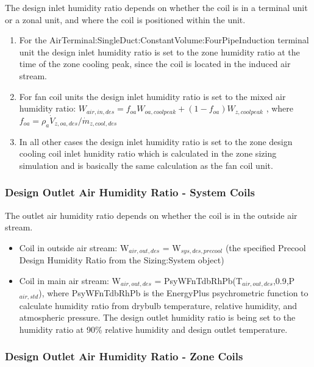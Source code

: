 The design inlet humidity ratio depends on whether the coil is in a terminal unit or a zonal unit, and where the coil is positioned within the unit.

\begin{enumerate}
\def\labelenumi{\arabic{enumi}.}
\item
  For the AirTerminal:SingleDuct:ConstantVolume:FourPipeInduction terminal unit the design inlet humidity ratio is set to the zone humidity ratio at the time of the zone cooling peak, since the coil is located in the induced air stream.
\item
  For fan coil units the design inlet humidity ratio is set to the mixed air humidity ratio: \(W_{air,in,des} = f_{oa}W_{oa,coolpeak} + \left(1-f_{oa}\right)W_{z,coolpeak}\) , where \(f_{oa} = \rho_a \dot V_{z,oa,des} / \dot m_{z,cool,des}\)
\item
  In all other cases the design inlet humidity ratio is set to the zone design cooling coil inlet hunidity ratio which is calculated in the zone sizing simulation and is basically the same calculation as the fan coil unit.
\end{enumerate}

\subsubsection{Design Outlet Air Humidity Ratio - System Coils}\label{design-outlet-air-humidity-ratio---system-coils}

The outlet air humidity ratio depends on whether the coil is in the outside air stream.

\begin{itemize}
\item
  Coil in outside air stream: W\(_{air,out,des}\) = W\(_{sys,des,precool}\) (the specified Precool Design Humidity Ratio from the Sizing:System object)
\item
  Coil in main air stream: W\(_{air,out,des}\) = PsyWFnTdbRhPb(T\(_{air,out,des}\),0.9,P\(_{air,std}\)), where PsyWFnTdbRhPb is the EnergyPlus psychrometric function to calculate humidity ratio from drybulb temperature, relative humidity, and atmospheric pressure. The design outlet humidity ratio is being set to the humidity ratio at 90\% relative humidity and design outlet temperature.
\end{itemize}

\subsubsection{Design Outlet Air Humidity Ratio - Zone Coils}\label{design-outlet-air-humidity-ratio---zone-coils}

